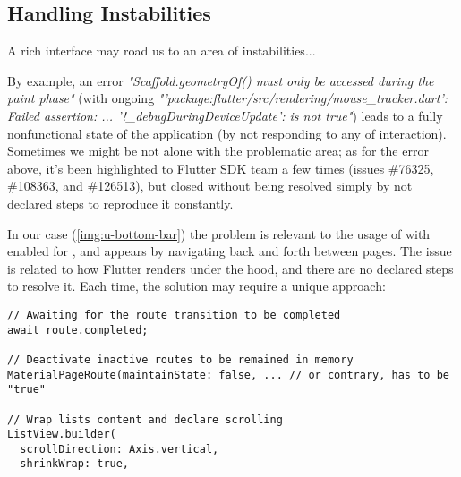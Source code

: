 
\subsection{Handling Instabilities}

A rich interface may road us to an area of instabilities...

By example, an error \emph{"Scaffold.geometryOf() must only be accessed during the paint phase"} (with ongoing 
\emph{"'package:flutter/src/rendering/mouse\_tracker.dart': Failed assertion: ... '!\_debugDuringDeviceUpdate': 
is not true"}) leads to a fully nonfunctional state  of the application (by not responding to any of interaction).
Sometimes we might be not alone with the problematic area; as for the error above, it's been highlighted to Flutter 
SDK team a few times (issues \href{https://github.com/flutter/flutter/issues/76325}{\#76325},
\href{https://github.com/flutter/flutter/issues/108363}{\#108363}, and
\href{https://github.com/flutter/flutter/issues/126513}{\#126513}), but closed without being resolved simply by not 
declared steps to reproduce it constantly.


In our case (\cref{img:u-bottom-bar}) the problem is relevant to the usage of  
with enabled  for , and appears by navigating back and forth between pages. The issue 
is related to how Flutter renders under the hood, and there are no declared steps to resolve it. Each time, the 
solution may require a unique approach:

\begin{lstlisting}
// Awaiting for the route transition to be completed
await route.completed;

// Deactivate inactive routes to be remained in memory
MaterialPageRoute(maintainState: false, ... // or contrary, has to be "true"

// Wrap lists content and declare scrolling
ListView.builder(
  scrollDirection: Axis.vertical,
  shrinkWrap: true,
\end{lstlisting}

